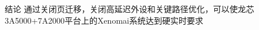 \documentclass{beamer}
\begin{document}
\begin{frame}{结论}
    通过关闭页迁移，关闭高延迟外设和关键路径优化，可以使龙芯3A5000+7A2000平台上的Xenomai系统达到硬实时要求
\end{frame}







\end{document}

